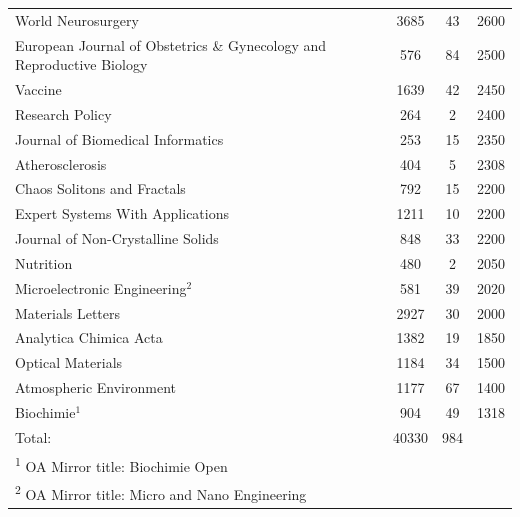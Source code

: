 \documentclass[english,man]{apa6}
\begin{document}
\begin{table}
{\begin{tabular}[t]{lccc}
World Neurosurgery & 3685 & 43 & 2600\\
European Journal of Obstetrics \& Gynecology and Reproductive Biology & 576 & 84 & 2500\\
Vaccine & 1639 & 42 & 2450\\
Research Policy & 264 & 2 & 2400\\
Journal of Biomedical Informatics & 253 & 15 & 2350\\
Atherosclerosis & 404 & 5 & 2308\\
Chaos Solitons and Fractals & 792 & 15 & 2200\\
Expert Systems With Applications & 1211 & 10 & 2200\\
Journal of Non-Crystalline Solids & 848 & 33 & 2200\\
Nutrition & 480 & 2 & 2050\\
Microelectronic Engineering$^{2}$ & 581 & 39 & 2020\\
Materials Letters & 2927 & 30 & 2000\\
Analytica Chimica Acta & 1382 & 19 & 1850\\
Optical Materials & 1184 & 34 & 1500\\
Atmospheric Environment & 1177 & 67 & 1400\\
Biochimie$^{1}$ & 904 & 49 & 1318\\
Total: & 40330 & 984 & \\
\bottomrule
\multicolumn{4}{l}{\textsuperscript{1} OA Mirror title: Biochimie Open}\\
\multicolumn{4}{l}{\textsuperscript{2} OA Mirror title: Micro and Nano Engineering}\\
\end{tabular}}
\end{table}

\begin{table}

\caption{\label{tab:Table2}Geographic Richness and Geographic Diversity of lead authors of papers published in Open Access (OA) and Paywalled (PW) journals. The value for PW is the mean of 1000 bootstrap-generated article collections identical in size to the OA collection. Single: authors of single-authored papers; First: first authors of co-authored papers.}
\centering
{}
\end{table}
\end{document}
